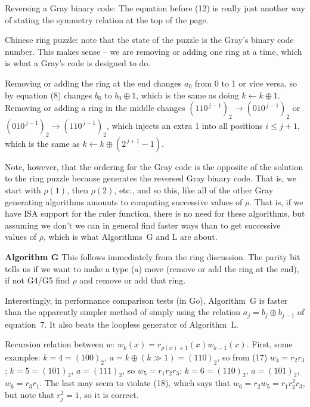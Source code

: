  Reversing a Gray binary code: The equation
before (12) is really just another way of stating the symmetry
relation at the top of the page.

 Chinese ring puzzle: note that the state
of the puzzle is the Gray's binary code number.  This makes sense --
we are removing or adding one ring at a time, which is what
a Gray's code is designed to do.

Removing or adding the ring at the end changes $a_0$ from
0 to 1 or vice versa, so by equation (8) changes $b_0$ to $b_0 \oplus 1$,
which is the same as doing $k \gets k \oplus 1$.  Removing or
adding a ring in the middle changes $\left(110^{\,j-1}\right)_2 \rightarrow
\left(010^{\,j-1}\right)_2$ or $\left(010^{\,j-1}\right)_2 \rightarrow
\left(110^{\,j-1}\right)_2$, which injects an extra 1 into all positions
$i \le j+1$, which is the same as $k \gets k \oplus \left(2^{\,j+1} - 1\right)$.

Note, however, that the ordering for the Gray code 
is the opposite of the solution to the ring puzzle
because generates the reversed Gray binary code.  That is,
we start with $\rho\left(1\right)$, then $\rho\left(2\right)$, etc.,
and so this, like all of the other Gray generating algorithms
amounts to computing successive values of $\rho$.  That is,
if we have ISA support for the ruler function, there is no need
for these algorithms, but assuming we don't we can in general
find faster ways than to get successive values of $\rho$, which
is what Algorithms~G and L are about.

 {\bf Algorithm G}\hfil\break
This follows immediately from the ring discussion.  
The parity bit tells us if we want to make a type (a) move (remove or add the ring
at the end), if not G4/G5 find $\rho$ and remove or add that ring.

Interestingly, in performance comparison tests (in Go), Algorithm~G is faster
than the apparently simpler method of simply using the relation
$a_j = b_j \oplus b_{j-1}$ of equation~7.  It also beats the loopless
generator of Algorithm~L.

 Recursion relation between $w$:
$w_k\left(x\right) = r_{\rho\left(x\right) + 1}\left(x\right) w_{k-1} \left(x\right)$.
First, some examples: $k = 4 = \left(1 0 0 \right)_2$, $a = k \oplus 
\left(k \gg 1\right) = \left(1 1 0 \right)_2$, so from (17)
$w_4 = r_2 r_3$; $k = 5 = \left(1 0 1\right)_2$, $a = \left( 1 1 1 \right)_2$,
so $w_5 = r_1 r_2 r_3$; $k = 6 = \left( 1 1 0 \right)_2$,
$a = \left(1 0 1\right)_2$, $w_6 = r_3 r_1$.  The last may seem to
violate (18), which says that $w_6 = r_2 w_5 = r_1 r_2^2 r_3$, but
note that $r_j^2 = 1$, so it is correct.


